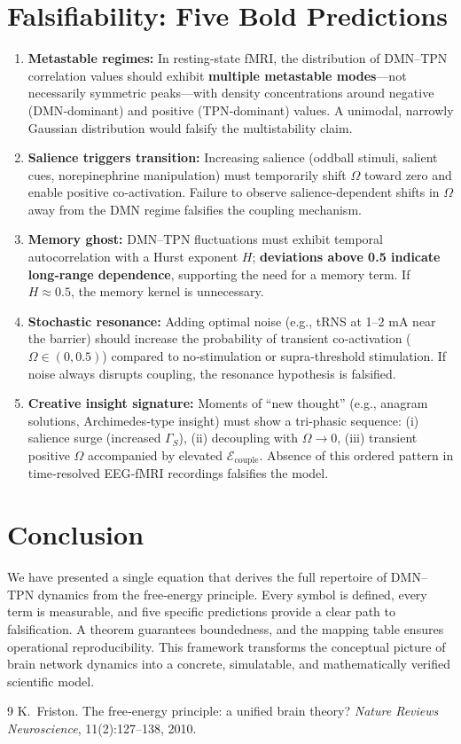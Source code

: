 \documentclass[11pt]{article}
\begin{document}
\section{Falsifiability: Five Bold Predictions}
\begin{enumerate}
    \item \textbf{Metastable regimes:} In resting‑state fMRI, the distribution of DMN–TPN correlation values should exhibit \textbf{multiple metastable modes}—not necessarily symmetric peaks—with density concentrations around negative (DMN‑dominant) and positive (TPN‑dominant) values. A unimodal, narrowly Gaussian distribution would falsify the multistability claim.
    \item \textbf{Salience triggers transition:} Increasing salience (oddball stimuli, salient cues, norepinephrine manipulation) must temporarily shift $\Omega$ toward zero and enable positive co‑activation. Failure to observe salience‑dependent shifts in $\Omega$ away from the DMN regime falsifies the coupling mechanism.
    \item \textbf{Memory ghost:} DMN–TPN fluctuations must exhibit temporal autocorrelation with a Hurst exponent $H$; \textbf{deviations above 0.5 indicate long‑range dependence}, supporting the need for a memory term. If $H\approx 0.5$, the memory kernel is unnecessary.
    \item \textbf{Stochastic resonance:} Adding optimal noise (e.g., tRNS at 1–2 mA near the barrier) should increase the probability of transient co‑activation ($\Omega \in (0,0.5)$) compared to no‑stimulation or supra‑threshold stimulation. If noise always disrupts coupling, the resonance hypothesis is falsified.
    \item \textbf{Creative insight signature:} Moments of “new thought” (e.g., anagram solutions, Archimedes‑type insight) must show a tri‑phasic sequence: (i) salience surge (increased $\Gamma_S$), (ii) decoupling with $\Omega\to0$, (iii) transient positive $\Omega$ accompanied by elevated $\mathcal{E}_{\text{couple}}$. Absence of this ordered pattern in time‑resolved EEG‑fMRI recordings falsifies the model.
\end{enumerate}

\section{Conclusion}
We have presented a single equation that derives the full repertoire of DMN–TPN dynamics from the free‑energy principle. Every symbol is defined, every term is measurable, and five specific predictions provide a clear path to falsification. A theorem guarantees boundedness, and the mapping table ensures operational reproducibility. This framework transforms the conceptual picture of brain network dynamics into a concrete, simulatable, and mathematically verified scientific model.


\begin{thebibliography}{9}
K.~Friston.
\newblock The free‑energy principle: a unified brain theory?
\newblock \emph{Nature Reviews Neuroscience}, 11(2):127--138, 2010.
\end{thebibliography}
\end{document}
